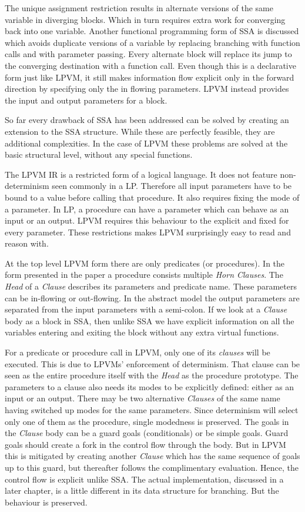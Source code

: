 The unique assignment restriction results in alternate versions of the same
variable in diverging blocks. Which in turn requires extra work for converging
back into one variable. Another functional programming form of SSA
\citep{appelfp} is discussed which avoids duplicate versions of a variable by
replacing branching with function calls and \phifs with parameter
passing. Every alternate block will replace its jump to the converging
destination with a function call. Even though this is a declarative form just
like LPVM, it still makes information flow explicit only in the forward
direction by specifying only the in flowing parameters. LPVM instead provides
the input and output parameters for a block.

So far every drawback of SSA has been addressed can be solved by creating an
extension to the SSA structure. While these are perfectly feasible, they are
additional complexities. In the case of LPVM these problems are solved at the
basic structural level, without any special functions.

The LPVM IR is a restricted form of a logical language. It does not feature
non-determinism seen commonly in a LP. Therefore all input parameters have to
be bound to a value before calling that procedure. It also requires fixing the
mode of a parameter. In LP, a procedure can have a parameter which can behave
as an input or an output. LPVM requires this behaviour to the explicit and
fixed for every parameter. These restrictions makes LPVM surprisingly easy to
read and reason with.


At the top level LPVM form there are only predicates (or procedures). In the
form presented in the paper a procedure consists multiple \textit{Horn
  Clauses}. The \textit{Head} of a \textit{Clause} describes its parameters and
predicate name. These parameters can be in-flowing or out-flowing. In the
abstract model the output parameters are separated from the input parameters
with a semi-colon. If we look at a \textit{Clause} body as a block in SSA,
then unlike SSA we have explicit information on all the variables entering and
exiting the block without any extra virtual functions.

For a predicate or procedure call in LPVM, only one of its \textit{clauses} will be
executed. This is due to LPVMs' enforcement of determinism. That clause can be
seen as the entire procedure itself with the \textit{Head} as the procedure
prototype. The parameters to a clause also needs its modes to be explicitly
defined: either as an input or an output. There may be two alternative
\textit{Clauses} of the same name having switched up modes for the same
parameters. Since determinism will select only one of them as the procedure,
single modedness is preserved. The goals in the \textit{Clause} body can be a
guard goals (conditionals) or be simple goals. Guard goals should create a fork
in the control flow through the body. But in LPVM this is mitigated by creating
another \textit{Clause} which has the same sequence of goals up to this guard,
but thereafter follows the complimentary evaluation. Hence, the control flow is
explicit unlike SSA. The actual implementation, discussed in a later chapter,
is a little different in its data structure for branching. But the behaviour is
preserved. 


